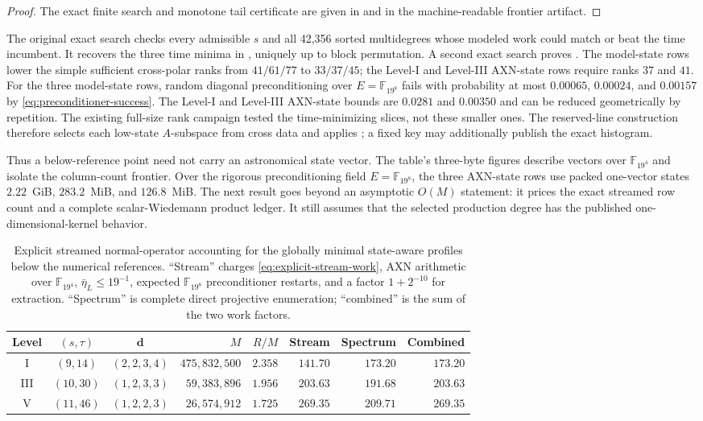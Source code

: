 \documentclass[11pt]{article}
\newcommand{\F}{\mathbb F}
\begin{document}
\begin{proof}
The exact finite search and monotone tail certificate are given in
 and in the machine-readable frontier artifact.
\end{proof}

The original exact search checks every admissible $s$ and all 42,356 sorted
multidegrees whose modeled work could match or beat the time incumbent.  It
recovers the three time minima in , uniquely up to block
permutation.  A second exact search proves .
The model-state rows lower the simple sufficient cross-polar ranks from
$41/61/77$ to $33/37/45$; the Level-I and Level-III AXN-state rows require
ranks $37$ and $41$.  For the three model-state rows, random diagonal
preconditioning over $E=\F_{19^8}$ fails with probability at most $0.00065$,
$0.00024$, and $0.00157$ by \eqref{eq:preconditioner-success}.  The Level-I
and Level-III AXN-state bounds are $0.0281$ and $0.00350$ and can be reduced
geometrically by repetition.  The existing full-size rank campaign tested the
time-minimizing slices, not these smaller ones.  The reserved-line construction
therefore selects each low-state $A$-subspace from cross data and applies
; a fixed key may additionally publish the exact
histogram.

Thus a below-reference point need not carry an astronomical state vector.
The table's three-byte figures describe vectors over $\F_{19^4}$ and isolate
the column-count frontier.  Over the rigorous preconditioning field
$E=\F_{19^8}$, the three AXN-state rows use packed one-vector states
$2.22$~GiB, $283.2$~MiB, and $126.8$~MiB.  The next result goes beyond an
asymptotic $O(M)$ statement: it prices the exact streamed row count and a
complete scalar-Wiedemann product ledger.  It still assumes that the selected
production degree has the published one-dimensional-kernel behavior.

\begin{table}[H]
\centering
\caption{Explicit streamed normal-operator accounting for the globally
minimal state-aware profiles below the numerical references.  ``Stream''
charges \eqref{eq:explicit-stream-work}, AXN arithmetic over $\F_{19^4}$,
$\bar\eta_L\le19^{-1}$, expected $\F_{19^8}$ preconditioner restarts, and a
factor $1+2^{-10}$ for extraction.  ``Spectrum'' is complete direct
projective enumeration; ``combined'' is the sum of the two work factors.}
\label{tab:explicit-stream}
\tiny
\setlength{\tabcolsep}{2.5pt}
\begin{tabular}{@{}c c c r r r r r@{}}
\toprule
Level & $(s,\tau)$ & $\mathbf d$ & $M$ & $R/M$ & Stream & Spectrum & Combined\\
\midrule
I   & $(9,14)$  & $(2,2,3,4)$ & $475{,}832{,}500$ & $2.358$ & $141.70$ & $173.20$ & $173.20$\\
III & $(10,30)$ & $(1,2,3,3)$ & $59{,}383{,}896$  & $1.956$ & $203.63$ & $191.68$ & $203.63$\\
V   & $(11,46)$ & $(1,2,2,3)$ & $26{,}574{,}912$  & $1.725$ & $269.35$ & $209.71$ & $269.35$\\
\bottomrule
\end{tabular}
\end{table}
\end{document}
